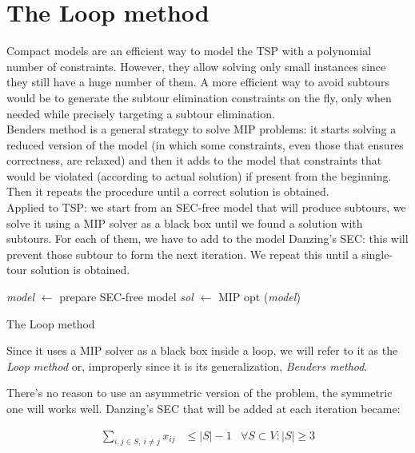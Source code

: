 \section{The Loop method}
Compact models are an efficient way to model the TSP with a polynomial number of
constraints. However, they allow solving only small instances since they still
have a huge number of them. A more efficient way to avoid subtours would be to
generate the subtour elimination constraints on the fly, only when needed while
precisely targeting a subtour elimination.\\
Benders method is a general strategy to solve MIP problems: it starts solving a
reduced version of the model (in which some constraints, even those that ensures
correctness, are relaxed) and then it adds to the model that constraints that
would be violated (according to actual solution) if present from the beginning.
Then it repeats the procedure until a correct solution is obtained.\\
Applied to TSP: we start from an SEC-free model that will produce subtours, we
solve it using a MIP solver as a black box until we found a solution with
subtours. For each of them, we have to add to the model Danzing's SEC: this will
prevent those subtour to form the next iteration. We repeat this until a
single-tour solution is obtained.

\begin{algorithm}[H]
\SetAlgoLined
{}
    \emph{model} $\leftarrow$ prepare SEC-free model\;
    \emph{sol} $\leftarrow$ MIP opt (\emph{model})\;
    \caption{The Loop method}
\end{algorithm}

Since it uses a MIP solver as a black box inside a loop, we will refer to it as
the \emph{Loop method} or, improperly since it is its generalization,
\emph{Benders method}.

There's no reason to use an asymmetric version of the problem, the symmetric one will works well. Danzing's SEC
that will be added at each iteration became:

\begin{equation*} 
    \begin{array}{rrlr} 
        \displaystyle\sum_{i,j \in S,\ i \neq j} x_{ij} & \le |S|-1 & \forall S \subset V: |S| \ge 3
    \end{array} 
\end{equation*}

